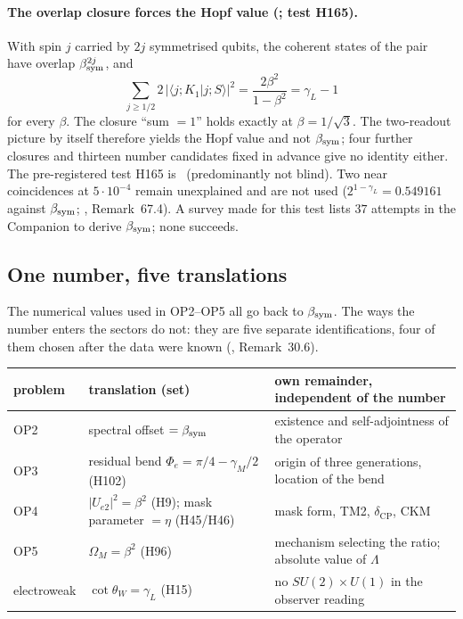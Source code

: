 \paragraph{The overlap closure forces the Hopf value (; test H165).}  With spin $j$ carried by $2j$ symmetrised qubits, the coherent states
of the pair have overlap $\beta_{\mathrm{sym}}^{2j}$, and
\begin{equation}
 \sum_{j\ge1/2}2\,|\langle j;K_1|j;S\rangle|^2=\frac{2\beta^2}{1-\beta^2}=\gamma_L-1
\end{equation}
for every $\beta$.  The closure ``sum $=1$'' holds exactly at $\beta=1/\sqrt3$.  The two-readout picture by itself therefore yields the Hopf value
and not $\beta_{\mathrm{sym}}$; four further closures and thirteen number candidates fixed in advance give no identity either.  The pre-registered test H165
is \Refuted\ (predominantly not blind).  Two near coincidences at $5\cdot10^{-4}$ remain unexplained and are not used
($2^{1-\gamma_L}=0.549161$ against $\beta_{\mathrm{sym}}$; , Remark~67.4).  A survey made for this test lists $37$ attempts in the Companion to derive
$\beta_{\mathrm{sym}}$; none succeeds.

\subsection{One number, five translations}
\label{sec:beta-translations}

The numerical values used in OP2--OP5 all go back to $\beta_{\mathrm{sym}}$.  The ways the number enters the sectors do not: they are five separate
identifications, four of them chosen after the data were known (, Remark~30.6).

\begin{center}\small
\begin{tabular}{@{}p{}p{}p{}@{}}
\toprule
problem & translation (set) & own remainder, independent of the number\\
\midrule
OP2 & spectral offset $=\beta_{\mathrm{sym}}$ & existence and self-adjointness of the operator\\
OP3 & residual bend $\Phi_e=\pi/4-\gamma_M/2$ (H102) & origin of three generations, location of the bend\\
OP4 & $|U_{e2}|^2=\beta^2$ (H9); mask parameter $=\eta$ (H45/H46) & mask form, TM2, $\delta_{\mathrm{CP}}$, CKM\\
OP5 & $\Omega_M=\beta^2$ (H96) & mechanism selecting the ratio; absolute value of $\Lambda$\\
electroweak & $\cot\theta_W=\gamma_L$ (H15) & no $SU(2)\times U(1)$ in the observer reading\\
\bottomrule
\end{tabular}
\end{center}


